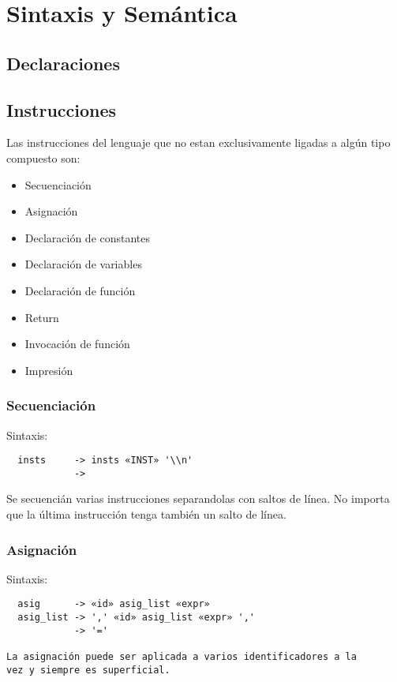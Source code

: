 \documentclass[12pt, spanish]{report}
\begin{document}
\section{Sintaxis y Semántica}
\label{sec:synsem}

\subsection{Declaraciones}
\label{sec:decl}

\subsection{Instrucciones}
\label{sec:instr}
Las instrucciones del lenguaje que no estan exclusivamente
ligadas a algún tipo compuesto son:
\begin{itemize}
\item Secuenciación
\item Asignación
\item Declaraci\'on de constantes
\item Declaraci\'on de variables
\item Declaraci\'on de funci\'on
\item Return
\item Invocación de funci\'on
\item Impresi\'on
\end{itemize}

\subsubsection{Secuenciaci\'on}
Sintaxis:
\begin{verbatim}
  insts     -> insts «INST» '\\n' 
            -> 
\end{verbatim}

Se secuenci\'an varias instrucciones separandolas con saltos
de l\'inea. No importa que la \'ultima instrucci\'on tenga
tambi\'en un salto de l\'inea.

\subsubsection{Asignación}
Sintaxis:
\begin{verbatim}
  asig      -> «id» asig_list «expr» 
  asig_list -> ',' «id» asig_list «expr» ','
            -> '='

La asignación puede ser aplicada a varios identificadores a la
vez y siempre es superficial.
\end{verbatim}
\end{document}
